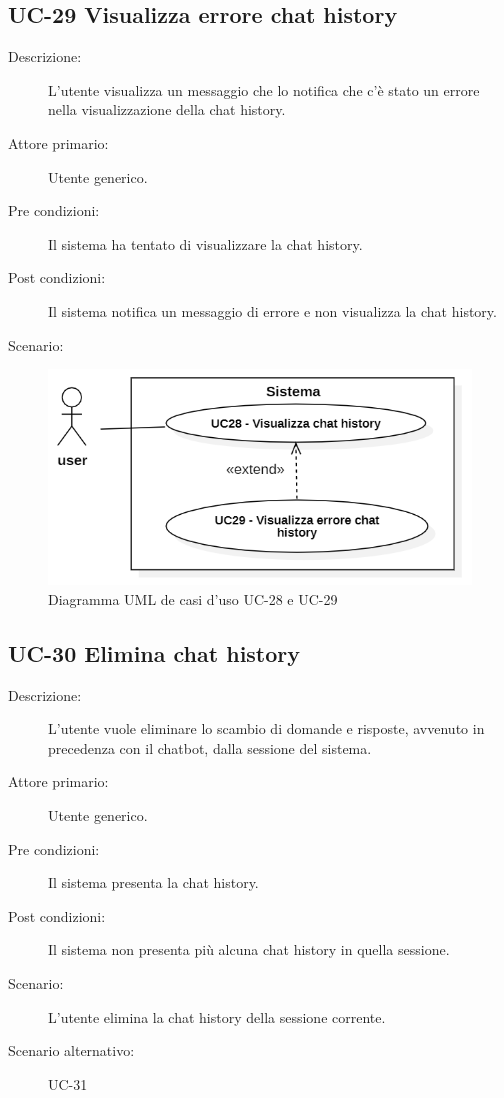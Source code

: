 \subsection{UC-29 Visualizza errore chat history }
\begin{description}
    \item[Descrizione:] L'utente visualizza un messaggio che lo notifica che c'è stato un errore nella visualizzazione della chat history.
    \item[Attore primario:] Utente generico.
    \item[Pre condizioni:] Il sistema ha tentato di visualizzare la chat history.
    \item[Post condizioni:] Il sistema notifica un messaggio di errore e non visualizza la chat history.
    \item[Scenario:] 
\end{description}

\begin{figure}[H]
    \centering
    \includegraphics[width=0.9\linewidth]{UC28-29.PNG}
    \caption{Diagramma UML de casi d'uso UC-28 e UC-29}
    \label{fig:UC28-29}
\end{figure}

\subsection{UC-30 Elimina chat history}
\begin{description}
    \item[Descrizione:] L'utente vuole eliminare lo scambio di domande e risposte, avvenuto in precedenza con il chatbot, dalla sessione del sistema.
    \item[Attore primario:] Utente generico.
    \item[Pre condizioni:] Il sistema presenta la chat history.
    \item[Post condizioni:] Il sistema non presenta più alcuna chat history in quella sessione.
    \item[Scenario:] L'utente elimina la chat history della sessione corrente.
    \item[Scenario alternativo:] UC-31
\end{description}

